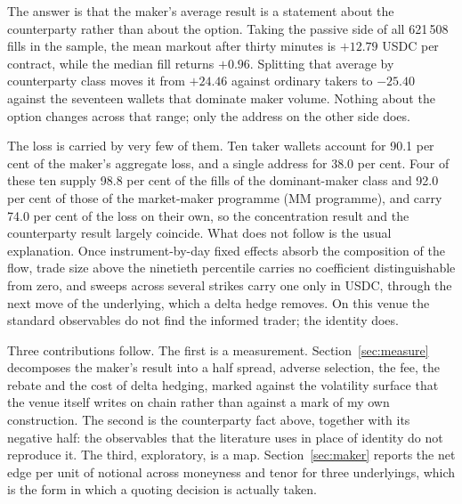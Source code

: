 \documentclass[a4paper,fleqn]{cas-dc}
\begin{document}
The answer is that the maker's average result is a statement about the counterparty rather than about the
option. Taking the passive side of all 621\,508 fills in the sample, the mean markout after thirty minutes
is $+12.79$ USDC per contract, while the median fill returns $+0.96$. Splitting that average by counterparty
class moves it from $+24.46$ against ordinary takers to $-25.40$ against the seventeen wallets that dominate
maker volume. Nothing about the option changes across that range; only the address on the other side does.

The loss is carried by very few of them. Ten taker wallets account for 90.1 per cent of the maker's
aggregate loss, and a single address for 38.0 per cent. Four of these ten supply 98.8 per cent of the
fills of the dominant-maker class and 92.0 per cent of those of the market-maker programme (MM programme), and
carry 74.0 per cent of the loss on their own, so the concentration result and the counterparty result largely
coincide. What does not follow is the
usual explanation. Once instrument-by-day fixed effects absorb the composition of the flow, trade size above the
ninetieth percentile carries no coefficient distinguishable from zero, and sweeps across several strikes carry
one only in USDC, through the next move of the underlying, which a delta hedge removes. On this venue the standard observables do not find the informed trader; the identity does.

Three contributions follow. The first is a measurement. Section~\ref{sec:measure} decomposes the maker's
result into a half spread, adverse selection, the fee, the rebate and the cost of delta hedging, marked
against the volatility surface that the venue itself writes on chain rather than against a mark of my own
construction. The second is the counterparty fact above, together with its negative half: the observables
that the literature uses in place of identity do not reproduce it. The third, exploratory, is a map. Section~\ref{sec:maker}
reports the net edge per unit of notional across moneyness and tenor for three underlyings, which is the
form in which a quoting decision is actually taken.
\end{document}
